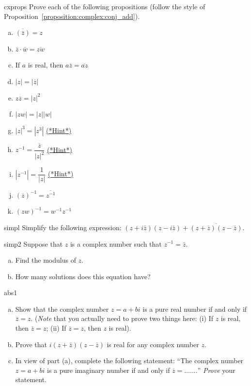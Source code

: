 \begin{exercise}{cxprops}
Prove each of the following propositions (follow the style of Proposition~\ref{proposition:complex:conj_add}).
\begin{multicols}{2}
\begin{enumerate}[(a)]
\item
$\overline{(\bar{z})} = z$
\item 
$\overline{z} \cdot \overline{w} = \overline{zw}$
\item
If $a$ is real, then $a \overline{z} = \overline{az}$
\item
$|z| = | \overline{z}|$
\item
$z \overline{z} = |z|^2$
 \item
$|z w| = |z|  |w|$
\item
$|z|^3 = |z^3|$ 
\hyperref[sec:complex:hints]{(*Hint*)}
\item
$z^{-1} = \dfrac{\overline{z}}{|z|^2}$ 
\hyperref[sec:complex:hints]{(*Hint*)}

\item
$|z^{-1}| = \dfrac{1}{|z|}$
\hyperref[sec:complex:hints]{(*Hint*)}

\item
$(\overline{z})^{-1} = \overline { z^{-1} }$

\item
$(zw)^{-1} =  w^{-1} z^{-1}$

\end{enumerate}
\end{multicols}
\end{exercise}

\begin{exercise}{simpl}
Simplify the following expression: $(z + i\bar{z})(z - i\bar{z}) + \overline{(z + \bar{z})(z - \bar{z})}$.
\end{exercise}

\begin{exercise}{simp2}
Suppose that $z$ is a complex number such that $z^{-1} = \bar{z}$.
\begin{enumerate}[(a)]
\item
Find the modulus of $z$.
\item
How many solutions does this equation have?
\end{enumerate}
\end{exercise}

\begin{exercise}{abs1}
\begin{enumerate}[(a)]
\item
Show that the complex number $z=a+bi$ is a pure real number if and only if $\overline{z} = z$.  (\emph{Note} that you actually need to prove two things here: (i) If $z$ is real, then $\overline{z} = z$; (ii) If $\overline{z} = z$, then $z$ is real).
\item
Prove that $i(z + \bar{z})(z - \bar{z})$ is real for any complex number $z$. 
\item
In view of part (a), complete the following statement:  ``The complex number $z=a+bi$ is a pure imaginary number if and only if $\overline{z} = \ldots \ldots.$'' \emph{Prove} your statement.
\end{enumerate}
\end{exercise}

